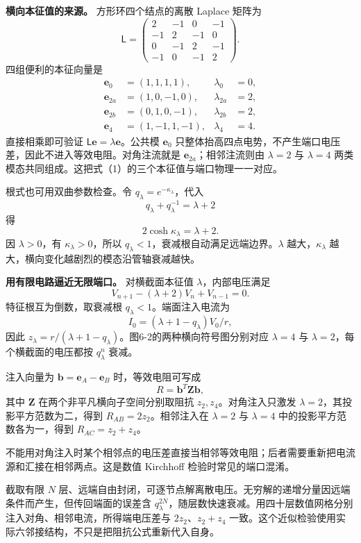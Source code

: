 \documentclass[12pt,a4paper,UTF8]{ctexart}
\begin{document}
\textbf{横向本征值的来源。} 方形环四个结点的离散 Laplace 矩阵为 \[
\mathsf L=
\begin{pmatrix}
2&-1&0&-1\\
-1&2&-1&0\\
0&-1&2&-1\\
-1&0&-1&2
\end{pmatrix}.
\] 四组便利的本征向量是 \[
\begin{aligned}
\boldsymbol e_0&=(1,1,1,1),&\lambda_0&=0,\\
\boldsymbol e_{2a}&=(1,0,-1,0),&\lambda_{2a}&=2,\\
\boldsymbol e_{2b}&=(0,1,0,-1),&\lambda_{2b}&=2,\\
\boldsymbol e_4&=(1,-1,1,-1),&\lambda_4&=4.
\end{aligned}
\] 直接相乘即可验证
\(\mathsf L\boldsymbol e=\lambda\boldsymbol e\)。公共模
\(\boldsymbol e_0\)
只整体抬高四点电势，不产生端口电压差，因此不进入等效电阻。对角注流就是
\(\boldsymbol e_{2a}\)；相邻注流则由 \(\lambda=2\) 与 \(\lambda=4\)
两类模态共同组成。这把式（1）的三个本征值与端口物理一一对应。

根式也可用双曲参数检查。令 \(q_\lambda=e^{-\kappa_\lambda}\)，代入 \[
q_\lambda+q_\lambda^{-1}=\lambda+2
\] 得 \[
2\cosh\kappa_\lambda=\lambda+2.
\] 因 \(\lambda>0\)，有 \(\kappa_\lambda>0\)，所以
\(q_\lambda<1\)，衰减根自动满足远端边界。\(\lambda\)
越大，\(\kappa_\lambda\) 越大，横向变化越剧烈的模态沿管轴衰减越快。

\textbf{用有限电路逼近无限端口。} 对横截面本征值
\(\lambda\)，内部电压满足 \[
V_{n+1}-(\lambda+2)V_n+V_{n-1}=0.
\] 特征根互为倒数，取衰减根 \(q_\lambda<1\)。端面注入电流为 \[
I_0=(\lambda+1-q_\lambda)V_0/r,
\] 因此
\(z_\lambda=r/(\lambda+1-q_\lambda)\)。图6-2的两种横向符号图分别对应
\(\lambda=4\) 与 \(\lambda=2\)，每个横截面的电压都按 \(q_\lambda^n\)
衰减。

注入向量为 \(\bm b=\bm e_A-\bm e_B\) 时，等效电阻可写成 \[
R=\bm b^T\bm Z\bm b,
\] 其中 \(\bm Z\) 在两个非平凡横向子空间分别取阻抗
\(z_2,z_4\)。对角注入只激发 \(\lambda=2\)，其投影平方范数为二，得到
\(R_{AB}=2z_2\)。相邻注入在 \(\lambda=2\) 与 \(\lambda=4\)
中的投影平方范数各为一，得到 \(R_{AC}=z_2+z_4\)。

不能用对角注入时某个相邻点的电压差直接当相邻等效电阻；后者需要重新把电流源和汇接在相邻两点。这是数值
Kirchhoff 检验时常见的端口混淆。

截取有限 \(N\)
层、远端自由封闭，可逐节点解离散电压。无穷解的递增分量因远端条件而产生，但传回端面的误差含
\(q_\lambda^{2N}\)，随层数快速衰减。用四十层数值网格分别注入对角、相邻电流，所得端电压差与
\(2z_2\)、\(z_2+z_4\)
一致。这个近似检验使用实际六邻接结构，不只是把阻抗公式重新代入自身。
\end{document}
